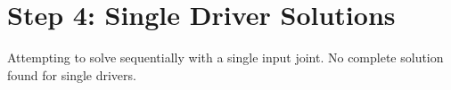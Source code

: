 \section{Step 4: Single Driver Solutions}
Attempting to solve sequentially with a single input joint.
No complete solution found for single drivers.
\newpage
